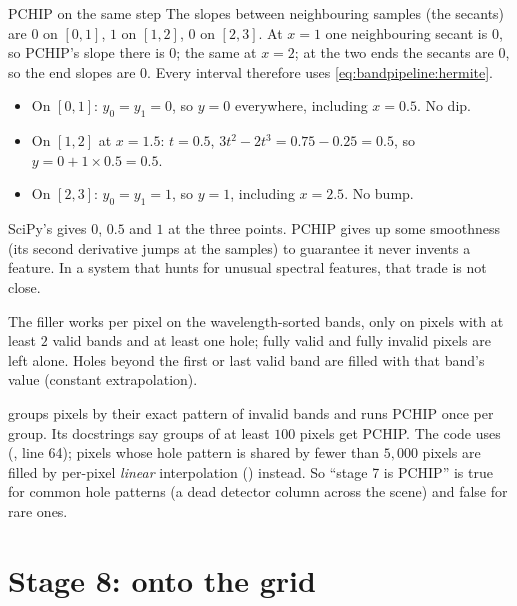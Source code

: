 \begin{worked}[label={we:bandpipeline:pchip}]{PCHIP on the same step}
The slopes between neighbouring samples (the secants) are $0$ on $[0,1]$, $1$ on $[1,2]$, $0$ on
$[2,3]$. At $x = 1$ one neighbouring secant is $0$, so PCHIP's slope there is $0$; the same at
$x = 2$; at the two ends the secants are $0$, so the end slopes are $0$. Every interval therefore uses
\cref{eq:bandpipeline:hermite}.
\begin{itemize}
\item On $[0,1]$: $y_0 = y_1 = 0$, so $y = 0$ everywhere, including $x = 0.5$. No dip.
\item On $[1,2]$ at $x = 1.5$: $t = 0.5$, $3t^2 - 2t^3 = 0.75 - 0.25 = 0.5$, so
$y = 0 + 1 \times 0.5 = 0.5$.
\item On $[2,3]$: $y_0 = y_1 = 1$, so $y = 1$, including $x = 2.5$. No bump.
\end{itemize}
SciPy's  gives $0$, $0.5$ and $1$ at the three points\tagC. PCHIP gives up
some smoothness (its second derivative jumps at the samples) to guarantee it never invents a
feature. In a system that hunts for unusual spectral features, that trade is not close.
\end{worked}

The filler works per pixel on the wavelength-sorted bands, only on pixels with at least $2$ valid
bands and at least one hole; fully valid and fully invalid pixels are left alone. Holes beyond the
first or last valid band are filled with that band's value (constant extrapolation).

\begin{sourcenote}
 groups pixels by their exact pattern of invalid bands and runs
PCHIP once per group. Its docstrings say groups of at least $100$ pixels get PCHIP. The code uses
 (, line 64); pixels whose hole pattern
is shared by fewer than $5{,}000$ pixels are filled by per-pixel \emph{linear} interpolation
() instead. So ``stage 7 is PCHIP'' is true for common hole patterns (a dead
detector column across the scene) and false for rare ones.
\end{sourcenote}

\section{Stage 8: onto the grid}\label{sec:bandpipeline:grid}

